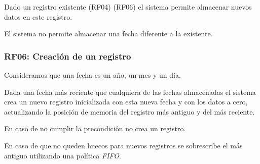 Dado un registro existente (RF04) (RF06) el sistema permite almacenar nuevos
datos en este registro.

El sistema no permite almacenar una fecha diferente a la existente.

\subsubsection{RF06: Creación de un registro}

Consideramos que una fecha es un año, un mes y un día.

Dada una fecha más reciente que cualquiera de las fechas almacenadas
el sistema crea un nuevo registro inicializada con esta nueva fecha
y con los datos a cero, actualizando la posición de memoria del registro
más antiguo y del más reciente.

En caso de no cumplir la precondición no crea un registro.

En caso de que no queden huecos para nuevos registros se sobrescribe
el más antiguo utilizando una política \textit{FIFO}.
